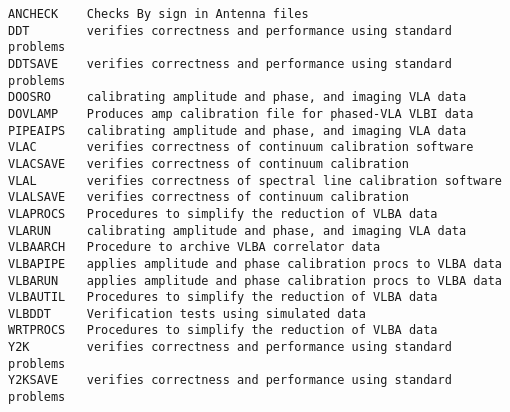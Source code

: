 \vskip 0.5pt
\bbve\begin{verbatim}
ANCHECK    Checks By sign in Antenna files
DDT        verifies correctness and performance using standard problems
DDTSAVE    verifies correctness and performance using standard problems
DOOSRO     calibrating amplitude and phase, and imaging VLA data
DOVLAMP    Produces amp calibration file for phased-VLA VLBI data
PIPEAIPS   calibrating amplitude and phase, and imaging VLA data
VLAC       verifies correctness of continuum calibration software
VLACSAVE   verifies correctness of continuum calibration
VLAL       verifies correctness of spectral line calibration software
VLALSAVE   verifies correctness of continuum calibration
VLAPROCS   Procedures to simplify the reduction of VLBA data
VLARUN     calibrating amplitude and phase, and imaging VLA data
VLBAARCH   Procedure to archive VLBA correlator data
VLBAPIPE   applies amplitude and phase calibration procs to VLBA data
VLBARUN    applies amplitude and phase calibration procs to VLBA data
VLBAUTIL   Procedures to simplify the reduction of VLBA data
VLBDDT     Verification tests using simulated data
WRTPROCS   Procedures to simplify the reduction of VLBA data
Y2K        verifies correctness and performance using standard problems
Y2KSAVE    verifies correctness and performance using standard problems
\end{verbatim}\eve


